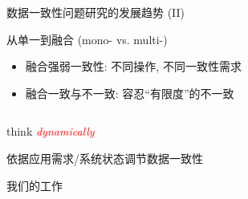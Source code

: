 \begin{frame}{数据一致性问题研究的发展趋势 (II)}
  \begin{description}
	\setlength{\itemsep}{10pt}
	\item[多样化:] 从单一到融合 (mono- vs. multi-)  
	  \vspace{5pt}
	  \begin{itemize}
		\setlength{\itemsep}{5pt}
		\item 融合强弱一致性: 不同操作, 不同一致性需求 
		\item 融合一致与不一致: 容忍``有限度''的不一致
	  \end{itemize}
	  \pause
	  \begin{columns}
	  \end{columns}
	  \pause
	\item[可调节:] think \textcolor{red}{\it dynamically} 
	  \vspace{10pt}
	  \begin{center}
	    依据应用需求/系统状态调节数据一致性
	  \end{center}
  \end{description}
\end{frame}
\begin{frame}{我们的工作}
  
\end{frame}
